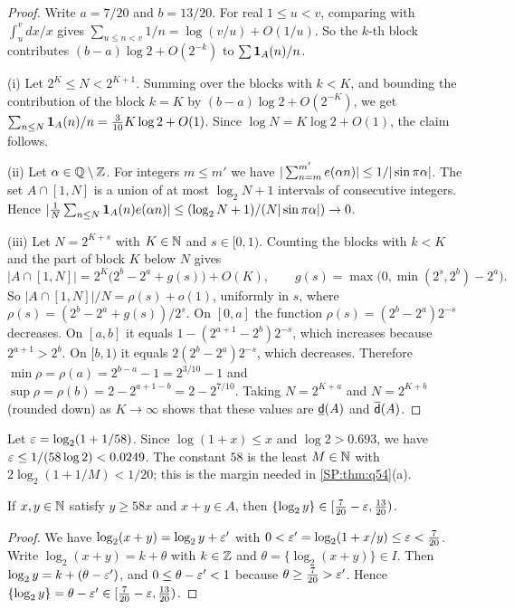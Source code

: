 \begin{proof}
Write $a=7/20$ and $b=13/20$. For real $1\le u<v$, comparing with $\int_u^v dx/x$ gives
$\sum_{u\le n<v}1/n=\log(v/u)+O(1/u)$. So the $k$-th block contributes
$(b-a)\log2+O(2^{-k})$ to $\sum\mathbf{1}_A(n)/n$.

(i) Let $2^K\le N<2^{K+1}$. Summing over the blocks with $k<K$, and bounding the contribution of
the block $k=K$ by $(b-a)\log 2+O(2^{-K})$, we get $\sum_{n\le N}\mathbf{1}_A(n)/n=\tfrac{3}{10}K\log2+O(1)$.
Since $\log N=K\log 2+O(1)$, the claim follows.

(ii) Let $\alpha\in\mathbb{Q}\setminus\mathbb{Z}$. For integers $m\le m'$ we have
$|\sum_{n=m}^{m'}e(\alpha n)|\le 1/|\sin\pi\alpha|$. The set $A\cap[1,N]$ is a union of at most
$\log_2N+1$ intervals of consecutive integers. Hence
$|\frac1N\sum_{n\le N}\mathbf{1}_A(n)e(\alpha n)|\le(\log_2N+1)/(N|\sin\pi\alpha|)\to0$.

(iii) Let $N=2^{K+s}$ with $K\in\mathbb{N}$ and $s\in[0,1)$. Counting the blocks with $k<K$ and the part
of block $K$ below $N$ gives
\[
|A\cap[1,N]|=2^K\big(2^b-2^a+g(s)\big)+O(K),\qquad g(s)=\max\big(0,\min(2^s,2^b)-2^a\big).
\]
So $|A\cap[1,N]|/N=\rho(s)+o(1)$, uniformly in $s$, where $\rho(s)=(2^b-2^a+g(s))/2^s$.
On $[0,a]$ the function $\rho(s)=(2^b-2^a)2^{-s}$ decreases. On $[a,b]$ it equals
$1-(2^{a+1}-2^b)2^{-s}$, which increases because $2^{a+1}>2^b$. On $[b,1)$ it equals
$2(2^b-2^a)2^{-s}$, which decreases. Therefore $\min\rho=\rho(a)=2^{b-a}-1=2^{3/10}-1$ and
$\sup\rho=\rho(b)=2-2^{a+1-b}=2-2^{7/10}$. Taking $N=2^{K+a}$ and $N=2^{K+b}$ (rounded down) as
$K\to\infty$ shows that these values are $\underline{\mathsf{d}}(A)$ and $\overline{\mathsf{d}}(A)$.
\end{proof}

Let $\varepsilon=\log_2(1+1/58)$. Since $\log(1+x)\le x$ and $\log2>0.693$, we have
$\varepsilon\le1/(58\log2)<0.0249$. The constant $58$ is the least $M\in\mathbb{N}$ with
$2\log_2(1+1/M)<1/20$; this is the margin needed in \cref{SP:thm:q54}(a).

\begin{lemma}\label{SP:lem:shiftphase}
If $x,y\in\mathbb{N}$ satisfy $y\ge58x$ and $x+y\in A$, then
$\{\log_2y\}\in[\tfrac7{20}-\varepsilon,\tfrac{13}{20})$.
\end{lemma}

\begin{proof}
We have $\log_2(x+y)=\log_2y+\varepsilon'$ with $0<\varepsilon'=\log_2(1+x/y)\le\varepsilon<\tfrac7{20}$. Write
$\log_2(x+y)=k+\theta$ with $k\in\mathbb{Z}$ and $\theta=\{\log_2(x+y)\}\in I$. Then
$\log_2y=k+(\theta-\varepsilon')$, and $0\le\theta-\varepsilon'<1$ because $\theta\ge\tfrac7{20}>\varepsilon'$. Hence
$\{\log_2y\}=\theta-\varepsilon'\in[\tfrac7{20}-\varepsilon,\tfrac{13}{20})$.
\end{proof}


